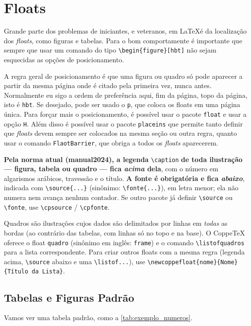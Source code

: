 \documentclass[dsc,pdfa]{coppe}
\begin{document}
\chapter{Floats}

Grande parte dos problemas de iniciantes, e veteranos, em \LaTeX é da localização dos \textit{floats}, como figuras e tabelas. Para o bom comportamente é importante que sempre que usar um comando do tipo \verb*|\begin{figure}[hbt]| não sejam esquecidas as opções de posicionamento.

A regra geral de posicionamento é que uma figura ou quadro só pode aparecer a partir da mesma página onde é citado pela primeira vez, nunca antes. Normalmente eu sigo a ordem de preferência aqui, fim da página, topo da página, isto é \verb*|hbt|. Se desejado, pode ser usado o \verb*|p|, que coloca os floats em uma página única. Para forçar mais o posicionamento, é possível usar o pacote \verb*|float| e usar a opção \verb*|H|. Além disso é possível usar o pacote \verb*|placeins| que permite tanto definir que \textit{floats} devem sempre ser colocados na mesma seção ou outra regra, quanto usar o comando \verb*|FlaotBarrier|, que obriga a todos os \textit{floats} aparecerem.

\textbf{Pela norma atual (manual2024), a legenda} \verb|\caption| \textbf{de toda ilustração --- figura, tabela ou quadro --- fica \emph{acima} dela}, com o número em algarismos arábicos, travessão e o título. \textbf{A fonte é obrigatória e fica \emph{abaixo}}, indicada com \verb|\source{...}| (sinônimo: \verb|\fonte{...}|), em letra menor; ela não numera nem avança nenhum contador. Se outro pacote já definir \verb|\source| ou \verb|\fonte|, use \verb|\cpsource| / \verb|\cpfonte|.

Quadros são ilustrações cujos dados são delimitados por linhas em \emph{todas} as bordas (ao contrário das tabelas, com linhas só no topo e na base). O CoppeTeX oferece o float \verb|quadro| (sinônimo em inglês: \verb|frame|) e o comando \verb|\listofquadros| para a lista correspondente. Para criar outros floats com a mesma regra (legenda acima, \verb|\source| abaixo e uma \verb|\listof...|), use \verb|\newcoppefloat{nome}{Nome}{Título da Lista}|.

\section{Tabelas e Figuras Padrão}

Vamos ver uma tabela padrão, como a \autoref{tab:exemplo_numeros}.
\end{document}
